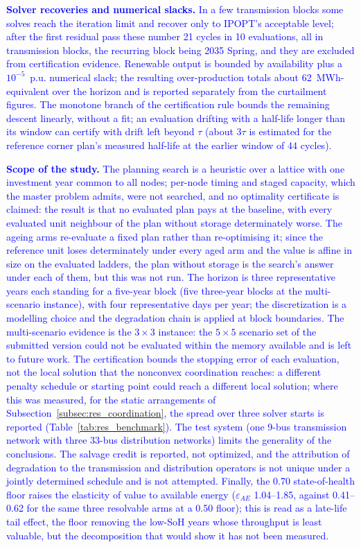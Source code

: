 \documentclass[preprint,12pt]{elsarticle}
\begin{document}
\textcolor{blue}{
    \textbf{Solver recoveries and numerical slacks.} In a few transmission blocks some solves reach the iteration limit and recover only to IPOPT's acceptable level; after the first residual pass these number 21 cycles in 10 evaluations, all in transmission blocks, the recurring block being 2035 Spring, and they are excluded from certification evidence. Renewable output is bounded by availability plus a $10^{-5}$~p.u. numerical slack; the resulting over-production totals about 62~MWh-equivalent over the horizon and is reported separately from the curtailment figures. The monotone branch of the certification rule bounds the remaining descent linearly, without a fit; an evaluation drifting with a half-life longer than its window can certify with drift left beyond $\tau$ (about $3\tau$ is estimated for the reference corner plan's measured half-life at the earlier window of 44 cycles).
}

\textcolor{blue}{
    \textbf{Scope of the study.} The planning search is a heuristic over a lattice with one investment year common to all nodes; per-node timing and staged capacity, which the master problem admits, were not searched, and no optimality certificate is claimed: the result is that no evaluated plan pays at the baseline, with every evaluated unit neighbour of the plan without storage determinately worse. The ageing arms re-evaluate a fixed plan rather than re-optimising it; since the reference unit loses determinately under every aged arm and the value is affine in size on the evaluated ladders, the plan without storage is the search's answer under each of them, but this was not run. The horizon is three representative years each standing for a five-year block (five three-year blocks at the multi-scenario instance), with four representative days per year; the discretization is a modelling choice and the degradation chain is applied at block boundaries. 
    The multi-scenario evidence is the $3 \times 3$ instance: the $5 \times 5$ scenario set of the submitted version could not be evaluated within the memory available and is left to future work. The certification bounds the stopping error of each evaluation, not the local solution that the nonconvex coordination reaches: a different penalty schedule or starting point could reach a different local solution; where this was measured, for the static arrangements of Subsection~\ref{subsec:res_coordination}, the spread over three solver starts is reported (Table~\ref{tab:res_benchmark}).
    The test system (one 9-bus transmission network with three 33-bus distribution networks) limits the generality of the conclusions. The salvage credit is reported, not optimized, and the attribution of degradation to the transmission and distribution operators is not unique under a jointly determined schedule and is not attempted. Finally, the 0.70 state-of-health floor raises the elasticity of value to available energy ($\varepsilon_{AE}$ 1.04--1.85, against 0.41--0.62 for the same three resolvable arms at a 0.50 floor); this is read as a late-life tail effect, the floor removing the low-SoH years whose throughput is least valuable, but the decomposition that would show it has not been measured.
}
\end{document}
